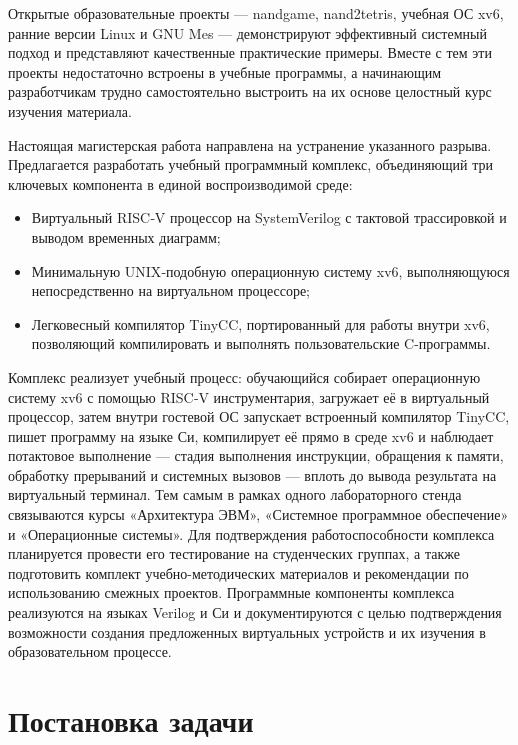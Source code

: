 Открытые образовательные проекты — nandgame, nand2tetris, учебная ОС xv6, ранние версии Linux и GNU Mes — демонстрируют эффективный системный подход и представляют качественные практические примеры. Вместе с тем эти проекты недостаточно встроены в учебные программы, а начинающим разработчикам трудно самостоятельно выстроить на их основе целостный курс изучения материала.

Настоящая магистерская работа направлена на устранение указанного разрыва. Предлагается разработать учебный программный комплекс, объединяющий три ключевых компонента в единой воспроизводимой среде:

\begin{itemize}
  \item Виртуальный RISC‑V процессор на SystemVerilog с тактовой трассировкой и выводом временных диаграмм;
  \item Минимальную UNIX‑подобную операционную систему xv6, выполняющуюся непосредственно на виртуальном процессоре;
  \item Легковесный компилятор TinyCC, портированный для работы внутри xv6, позволяющий компилировать и выполнять пользовательские C-программы.
\end{itemize}

Комплекс реализует учебный процесс: обучающийся собирает операционную систему xv6 с помощью RISC‑V инструментария, загружает её в виртуальный процессор, затем внутри гостевой ОС запускает встроенный компилятор TinyCC, пишет программу на языке Си, компилирует её прямо в среде xv6 и наблюдает потактовое выполнение — стадия выполнения инструкции, обращения к памяти, обработку прерываний и системных вызовов — вплоть до вывода результата на виртуальный терминал. Тем самым в рамках одного лабораторного стенда связываются курсы «Архитектура ЭВМ», «Системное программное обеспечение» и «Операционные системы». Для подтверждения работоспособности комплекса планируется провести его тестирование на студенческих группах, а также подготовить комплект учебно-методических материалов и рекомендации по использованию смежных проектов. Программные компоненты комплекса реализуются на языках Verilog и Си и документируются с целью подтверждения возможности создания предложенных виртуальных устройств и их изучения в образовательном процессе.



\section{Постановка задачи}
\label{sec:task}

